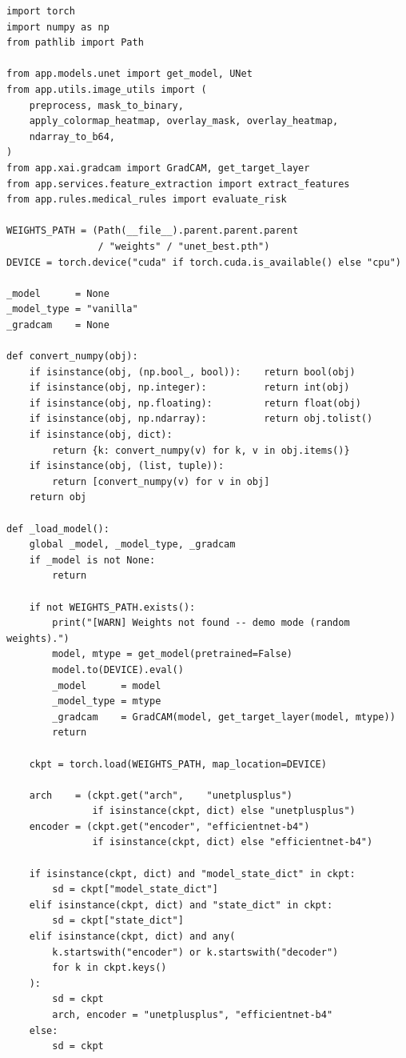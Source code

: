 \begin{lstlisting}[style=codePython, caption={Lazy model loading, auto-detect checkpoint va dieu phoi prediction pipeline (app/services/inference.py)}]
import torch
import numpy as np
from pathlib import Path

from app.models.unet import get_model, UNet
from app.utils.image_utils import (
    preprocess, mask_to_binary,
    apply_colormap_heatmap, overlay_mask, overlay_heatmap,
    ndarray_to_b64,
)
from app.xai.gradcam import GradCAM, get_target_layer
from app.services.feature_extraction import extract_features
from app.rules.medical_rules import evaluate_risk

WEIGHTS_PATH = (Path(__file__).parent.parent.parent
                / "weights" / "unet_best.pth")
DEVICE = torch.device("cuda" if torch.cuda.is_available() else "cpu")

_model      = None
_model_type = "vanilla"
_gradcam    = None

def convert_numpy(obj):
    if isinstance(obj, (np.bool_, bool)):    return bool(obj)
    if isinstance(obj, np.integer):          return int(obj)
    if isinstance(obj, np.floating):         return float(obj)
    if isinstance(obj, np.ndarray):          return obj.tolist()
    if isinstance(obj, dict):
        return {k: convert_numpy(v) for k, v in obj.items()}
    if isinstance(obj, (list, tuple)):
        return [convert_numpy(v) for v in obj]
    return obj

def _load_model():
    global _model, _model_type, _gradcam
    if _model is not None:
        return

    if not WEIGHTS_PATH.exists():
        print("[WARN] Weights not found -- demo mode (random weights).")
        model, mtype = get_model(pretrained=False)
        model.to(DEVICE).eval()
        _model      = model
        _model_type = mtype
        _gradcam    = GradCAM(model, get_target_layer(model, mtype))
        return

    ckpt = torch.load(WEIGHTS_PATH, map_location=DEVICE)

    arch    = (ckpt.get("arch",    "unetplusplus")
               if isinstance(ckpt, dict) else "unetplusplus")
    encoder = (ckpt.get("encoder", "efficientnet-b4")
               if isinstance(ckpt, dict) else "efficientnet-b4")

    if isinstance(ckpt, dict) and "model_state_dict" in ckpt:
        sd = ckpt["model_state_dict"]
    elif isinstance(ckpt, dict) and "state_dict" in ckpt:
        sd = ckpt["state_dict"]
    elif isinstance(ckpt, dict) and any(
        k.startswith("encoder") or k.startswith("decoder")
        for k in ckpt.keys()
    ):
        sd = ckpt
        arch, encoder = "unetplusplus", "efficientnet-b4"
    else:
        sd = ckpt


\end{lstlisting}
